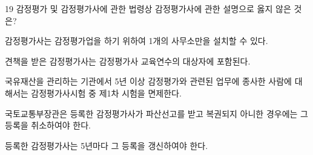 \begin{question}{19}
감정평가 및 감정평가사에 관한 법령상 감정평가사에 관한 설명으로 옳지 않은 것은?
\begin{choices}
  \item 감정평가사는 감정평가업을 하기 위하여 1개의 사무소만을 설치할 수 있다.
  \item 견책을 받은 감정평가사는 감정평가사 교육연수의 대상자에 포함된다.
  \item 국유재산을 관리하는 기관에서 5년 이상 감정평가와 관련된 업무에 종사한 사람에 대해서는 감정평가사시험 중 제1차 시험을 면제한다.
  \item 국토교통부장관은 등록한 감정평가사가 파산선고를 받고 복권되지 아니한 경우에는 그 등록을 취소하여야 한다.
  \item 등록한 감정평가사는 5년마다 그 등록을 갱신하여야 한다.
\end{choices}
\end{question}
